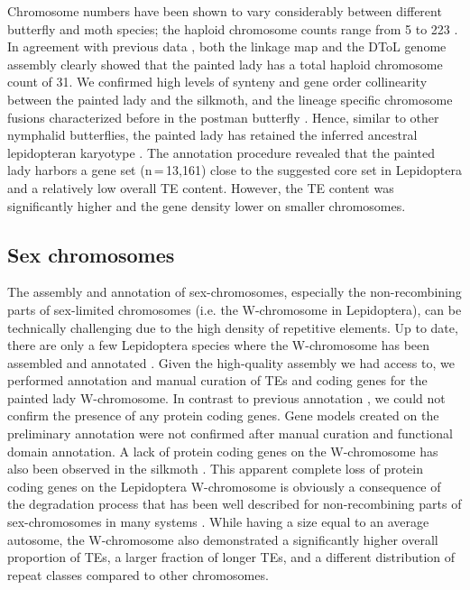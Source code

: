 \documentclass[twocolumn]{bmcart}%
\begin{document}
Chromosome numbers have been shown to vary considerably between different butterfly and moth species; the haploid chromosome counts range from 5 to 223 \citep{lukhtanovBlueButterflyPolyommatus2015, devosSpeciationChromosomalFusion2020}. In agreement with previous data \citep{zhangHighQualityGenomeAssembly2021}, both the linkage map and the DToL genome assembly clearly showed that the painted lady has a total haploid chromosome count of 31. We confirmed high levels of synteny and gene order collinearity between the painted lady and the silkmoth, and the lineage specific chromosome fusions characterized before in the postman butterfly \citep{daveyNoEvidenceMaintenance2017}. Hence, similar to other nymphalid butterflies, the painted lady has retained the inferred ancestral lepidopteran karyotype \citep{aholaGlanvilleFritillaryGenome2014}. The annotation procedure revealed that the painted lady harbors a gene set (n\,=\,13,161) close to the suggested core set in Lepidoptera \citep{challiLepbaseLepidopteranGenome2016, liInsectGenomesProgress2019} and a relatively low overall TE content. However, the TE content was significantly higher and the gene density lower on smaller chromosomes. 

\subsection*{Sex chromosomes}

The assembly and annotation of sex-chromosomes, especially the non-recombining parts of sex-limited chromosomes (i.e. the W-chromosome in Lepidoptera), can be technically challenging due to the high density of repetitive elements. Up to date, there are only a few Lepidoptera species where the W-chromosome has been assembled and annotated \cite{mitaGenomeSequenceSilkworm2004}. Given the high-quality assembly we had access to, we performed annotation and manual curation of TEs and coding genes for the painted lady W-chromosome. In contrast to previous annotation \cite{lohse_genome_2021}, we could not confirm the presence of any protein coding genes. Gene models created on the preliminary annotation were not confirmed after manual curation and functional domain annotation. A lack of protein coding genes on the W-chromosome has also been observed in the silkmoth \cite{mitaGenomeSequenceSilkworm2004}. This apparent complete loss of protein coding genes on the Lepidoptera W-chromosome is obviously a consequence of the degradation process that has been well described for non-recombining parts of sex-chromosomes in many systems \cite{bachtrogChromosomeEvolutionEmerging2013}. While having a size equal to an average autosome, the W-chromosome also demonstrated a significantly higher overall proportion of TEs, a larger fraction of longer TEs, and a different distribution of repeat classes compared to other chromosomes.
\end{document}
